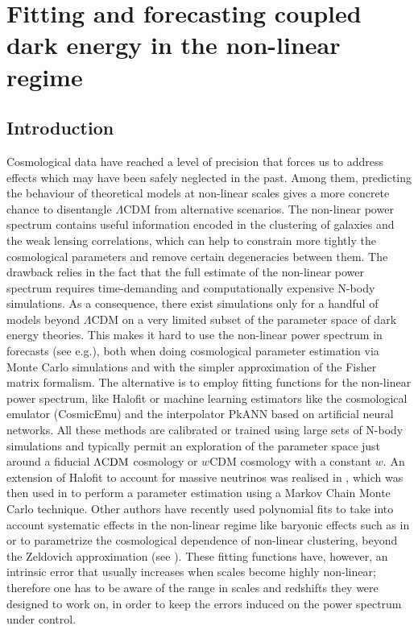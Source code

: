 \chapter{Fitting and forecasting coupled dark energy in the non-linear regime \label{chap:Fitting-CDE}}


\section{Introduction}





Cosmological data have reached a level of precision that forces us
to address effects which may have been safely neglected in the past.
Among them, predicting the behaviour of theoretical models at non-linear
scales gives a more concrete chance to disentangle $\Lambda$CDM from
alternative scenarios. The non-linear power spectrum contains useful
information encoded in the clustering of galaxies and the weak lensing
correlations, which can help to constrain more tightly the cosmological
parameters and remove certain degeneracies between them. The drawback
relies in the fact that the full estimate of the non-linear power
spectrum requires time-demanding and computationally expensive N-body
simulations. As a consequence, there exist simulations only for a
handful of models beyond $\Lambda$CDM on a very limited subset of
the parameter space of dark energy theories. This makes it hard to
use the non-linear power spectrum in forecasts (see e.g.),
both when doing cosmological parameter estimation via Monte Carlo
simulations and with the simpler approximation of the Fisher matrix
formalism. The alternative is to employ fitting functions for the
non-linear power spectrum, like Halofit \citep{smith_stable_2003,takahashi_revising_2012}
or machine learning estimators like the cosmological emulator (CosmicEmu)
\citep{heitmann_coyote_2010,lawrence_coyote_2010,heitmann_coyote_2014}
and the interpolator PkANN \cite{agarwal_pkann_2012,agarwal_pkann_2014}
based on artificial neural networks. All these methods are calibrated
or trained using large sets of N-body simulations and typically permit
an exploration of the parameter space just around a fiducial $\Lambda\mathrm{CDM}$
cosmology or $w\mbox{CDM }$cosmology with a constant $w$. An extension
of Halofit to account for massive neutrinos was realised in \citep{bird_massive_2011},
which was then used in \citep{audren_neutrino_2013} to perform a
parameter estimation using a Markov Chain Monte Carlo technique. Other
authors have recently used polynomial fits to take into account systematic
effects in the non-linear regime like baryonic effects such as in
\cite{bielefeld_cosmological_2014} or to parametrize the cosmological
dependence of non-linear clustering, beyond the Zeldovich approximation
(see \cite{mohammed_analytic_2014}). These fitting functions have,
however, an intrinsic error that usually increases when scales become
highly non-linear; therefore one has to be aware of the range in scales
and redshifts they were designed to work on, in order to keep the
errors induced on the power spectrum under control.


